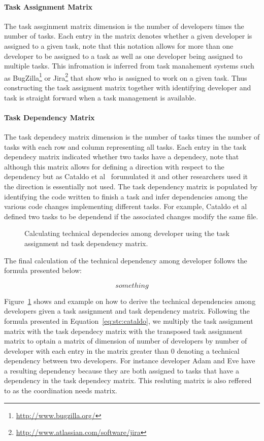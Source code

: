 \paragraph{Task Assignment Matrix}
The task assginment matrix dimension is the number of developers times the number of tasks.
Each entry in the matrix denotes whether a given developer is assigned to a given task, note that this notation allows for more than one developer to be assigned to a task as well as one developer being assigned to multiple tasks.
This infromation is inferred from task manahement systems such as BugZilla\footnote{\url{http://www.bugzilla.org/}} or Jira\footnote{\url{http://www.atlassian.com/software/jira}} that show who is assigned to work on a given task.
Thus constructing the task assigment matrix together with identifying developer and task is straight forward when a task management is available.

\paragraph{Task Dependency Matrix}
The task dependecy matrix dimension is the number of tasks times the number of tasks with each row and column representing all tasks.
Each entry in the task dependecy matrix indicated whether two tasks have a dependecy, note that although this matrix allows for defining a direction with respect to the dependency but as Cataldo et al~\cite{cataldo:cscw:2006} forumulated it and other researchers used it~\cite{} the direction is essentially not used.
The task dependency matrix is populated by identifying the code written to finish a task and infer dependencies among the various code changes implementing different tasks.
For example, Cataldo et al~\cite{cataldo:cscw:2006} defined two tasks to be dependend if the associated changes modify the same file. 

\begin{figure}[ht]
\centering
{}
\caption{Calculating technical dependecies among developer using the task assignment nd task dependency matrix.}
\label{chap:3:fig:example:stc:cataldo}
\end{figure}
The final calculation of the technical dependency among developer follows the formula presented below:

\begin{equation}
\label{eq:stc:cataldo}
something
\end{equation}

Figure~\ref{chap:3:fig:example:stc:cataldo} shows and example on how to derive the technical dependencies among developers given a task assignment and task dependency matrix.
Following the formula presented in Equation~\ref{eq:stc:cataldo}, we multiply the task assignment matrix with the task dependecy matrix with the transposed task assignment matrix to optain a matrix of dimension of number of developers by number of developer with each entry in the matrix greater than 0 denoting a technical dependency between two developers.
For instance developer Adam and Eve have a resulting dependency because they are both assigned to tasks that have a dependency in the task dependecy matrix. 
This resluting matrix is also reffered to as the coordination needs matrix.

